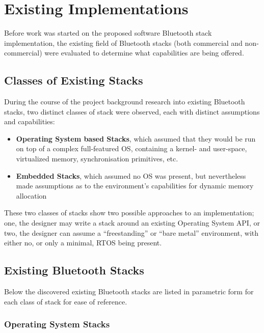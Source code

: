 \chapter{Existing Implementations}
\label{chp:existingimp}

Before work was started on the proposed software Bluetooth stack implementation, the existing field of Bluetooth stacks (both commercial and non-commercial) were evaluated to determine what capabilities are being offered.

\section{Classes of Existing Stacks}

During the course of the project background research into existing Bluetooth stacks, two distinct classes of stack were observed, each with distinct assumptions and capabilities:

\begin{itemize}
	\item \textbf{Operating System based Stacks}, which assumed that they would be run on top of a complex full-featured OS, containing a kernel- and user-space, virtualized memory, synchronisation primitives, etc.
	\item \textbf{Embedded Stacks}, which assumed no OS was present, but nevertheless made assumptions as to the environment's capabilities for dynamic memory allocation
\end{itemize}

These two classes of stacks show two possible approaches to an implementation; one, the designer may write a stack around an existing Operating System API, or two, the designer can assume a ``freestanding'' or ``bare metal'' environment, with either no, or only a minimal, RTOS being present.

\section{Existing Bluetooth Stacks}

Below the discovered existing Bluetooth stacks are listed in parametric form for each class of stack for ease of reference.

\subsection{Operating System Stacks}

